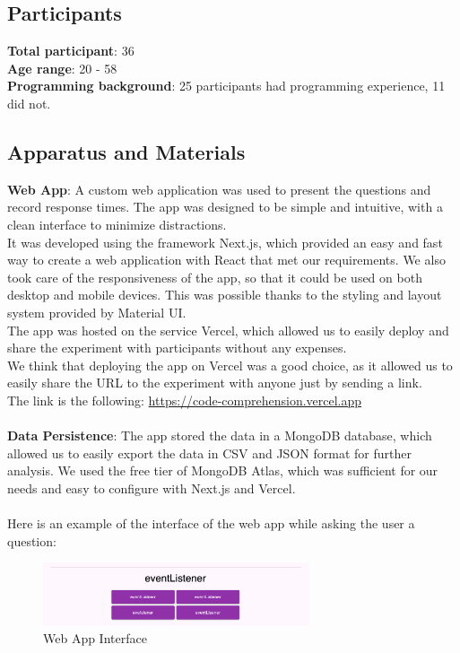 \documentclass[unicode,11pt,a4paper,oneside,numbers=endperiod,openany]{scrartcl}
\begin{document}
\subsection{Participants}
\textbf{Total participant}: 36 \\
\textbf{Age range}: 20 - 58 \\
\textbf{Programming background}: 25 participants had programming experience, 11 did not.

\subsection{Apparatus and Materials}
\textbf{Web App}: A custom web application was used to present the questions and record response times. The app was designed to be simple and intuitive, with a clean interface to minimize distractions. \\
It was developed using the framework Next.js, which provided an easy and fast way to create a web application with React that met our requirements.
We also took care of the responsiveness of the app, so that it could be used on both desktop and mobile devices. This was possible thanks to the styling and layout system provided by Material UI. \\
The app was hosted on the service Vercel, which allowed us to easily deploy and share the experiment with participants without any expenses. \\
We think that deploying the app on Vercel was a good choice, as it allowed us to easily share the URL to the experiment with anyone just by sending a link. \\
The link is the following: \url{https://code-comprehension.vercel.app} \\\\
\textbf{Data Persistence}: The app stored the data in a MongoDB database, which allowed us to easily export the data in CSV and JSON format for further analysis.
We used the free tier of MongoDB Atlas, which was sufficient for our needs and easy to configure with Next.js and Vercel. \\\\
Here is an example of the interface of the web app while asking the user a question:
\begin{figure}[h!]
    \centering
    \includegraphics[width=0.7\textwidth]{./figures/question_example.png}
    \caption{Web App Interface}
    \label{fig:webapp}
\end{figure}
\end{document}
